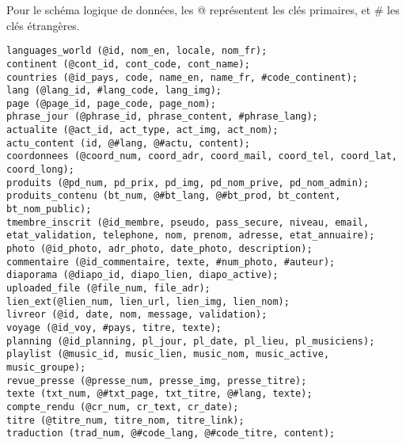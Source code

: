 \par Pour le schéma logique de données, les @ représentent les clés primaires, 
et \# les clés étrangères. \\
\begin{verbatim}
languages_world (@id, nom_en, locale, nom_fr);
continent (@cont_id, cont_code, cont_name);
countries (@id_pays, code, name_en, name_fr, #code_continent);
lang (@lang_id, #lang_code, lang_img);
page (@page_id, page_code, page_nom);
phrase_jour (@phrase_id, phrase_content, #phrase_lang);
actualite (@act_id, act_type, act_img, act_nom);
actu_content (id, @#lang, @#actu, content);
coordonnees (@coord_num, coord_adr, coord_mail, coord_tel, coord_lat, 
coord_long);
produits (@pd_num, pd_prix, pd_img, pd_nom_prive, pd_nom_admin);
produits_contenu (bt_num, @#bt_lang, @#bt_prod, bt_content, bt_nom_public);
tmembre_inscrit (@id_membre, pseudo, pass_secure, niveau, email, 
etat_validation, telephone, nom, prenom, adresse, etat_annuaire);
photo (@id_photo, adr_photo, date_photo, description);
commentaire (@id_commentaire, texte, #num_photo, #auteur);
diaporama (@diapo_id, diapo_lien, diapo_active);
uploaded_file (@file_num, file_adr);
lien_ext(@lien_num, lien_url, lien_img, lien_nom);
livreor (@id, date, nom, message, validation);
voyage (@id_voy, #pays, titre, texte);
planning (@id_planning, pl_jour, pl_date, pl_lieu, pl_musiciens);
playlist (@music_id, music_lien, music_nom, music_active, music_groupe);
revue_presse (@presse_num, presse_img, presse_titre);
texte (txt_num, @#txt_page, txt_titre, @#lang, texte);
compte_rendu (@cr_num, cr_text, cr_date);
titre (@titre_num, titre_nom, titre_link);
traduction (trad_num, @#code_lang, @#code_titre, content);
\end{verbatim}